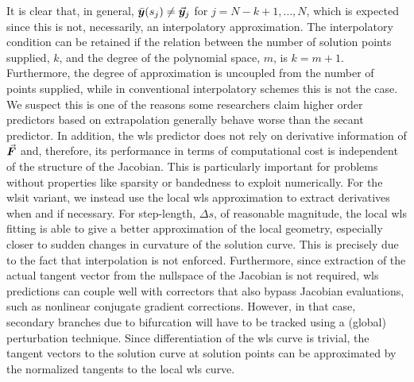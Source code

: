 It is clear that, in general,  
$\bar{\bm{y}}(s_j)\neq \vec{\bm{y}}_j$ for $j=N-k+1,\dots, N$, which is 
expected since this is not, necessarily,
an interpolatory approximation. The interpolatory
condition can be retained if the relation between the number of solution
points supplied, $k$, and the degree of the polynomial space, $m$, is $k=m+1$.
Furthermore, the degree of approximation
is uncoupled from the number of points supplied, while in conventional 
interpolatory
schemes this is not the case. We suspect this is one of the reasons some
researchers claim higher order predictors based on extrapolation generally 
behave worse than the secant 
predictor\cite{Seydel87,Salgovic81}. In addition, the \acrshort{wls} predictor 
does
not rely on derivative information of $\vec{\bm{F}}$ and, therefore, its 
performance in
terms of computational cost is independent of the structure of the Jacobian.
This is particularly important for problems without properties like sparsity or
bandedness to exploit numerically. For the \acrshort{wlsit} variant, we instead 
use the local \acrshort{wls} approximation to extract derivatives
when and if necessary. For step-length, $\Delta s$, of reasonable magnitude, 
the local \acrshort{wls}
fitting is able to give a better approximation of the local geometry, especially
closer to sudden changes in curvature of the solution curve. This is precisely
due to the fact that interpolation is not enforced. Furthermore, since
extraction of the actual tangent vector from the nullspace of the Jacobian is 
not required, \acrshort{wls} predictions can couple well with correctors that 
also bypass
Jacobian evaluations, such as nonlinear conjugate gradient
corrections\cite{Allgower91}. However, in that case, secondary branches due to
bifurcation will have to be tracked using a (global) perturbation technique.
Since differentiation of the \acrshort{wls} curve is trivial, the tangent 
vectors to the solution curve at solution points can be approximated by the 
normalized tangents to the local \acrshort{wls} curve.

